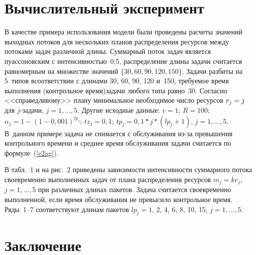 \begin{multicols}{2}
\renewcommand{\figurename}{\protect\bf Рис.}
\renewcommand{\tablename}{\protect\bf Таблица}



\section{Вычислительный эксперимент}

   В качестве примера использования модели были проведены расчеты 
значений выходных потоков для нескольких планов распределения ресурсов 
между потоками задач различной длины. Суммарный поток задач является 
пуассоновским с интенсивностью~0,5, распределение длины задачи считается 
равномерным на множестве значений $\{30, 60, 90, 120, 150\}$. Задачи разбиты 
на 5~типов в\linebreak соответствии с длинами 30, 60, 90, 120 и~150, тре\-буемое время 
выполнения (контрольное время)\linebreak задачи любого типа равно~30. Согласно 
<<справедливому>> плану минимальное необходимое чис\-ло ресурсов $r_j\hm=j$ 
для $j$-задачи, $j=1, \ldots , 5$. Другие исходные данные: $v=1$; $R=100$; 
$\alpha_j =1-(1-0{,}001)^{lp_j}$; $tz_j=0{,}1$; $tp_j =0{,}1 * j * (lp_j+1)$, $j=1, 
\ldots , 5$. В~данном примере задача не снимается с обслуживания из-за 
превышения контрольного времени и среднее время обслуживания задачи 
считается по формуле~(\ref{e2ag}). 



В табл.~1 и на рис.~2 приведены зависимости интенсивности суммарного 
потока своевременно выполненных задач от плана распределения ресурсов 
$m_j=kr_j$, $j=1, \ldots ,5$ при различных длинах пакетов. Задача считается 
своевременно выполненной, если время обслуживания не превысило 
контрольное время. Ряды~1--7 соответствуют длинам пакетов $lp_j=1$, 2, 4, 6, 
8, 10, 15, $j=1, \ldots ,5$.

\section{Заключение}
   

\end{multicols}
